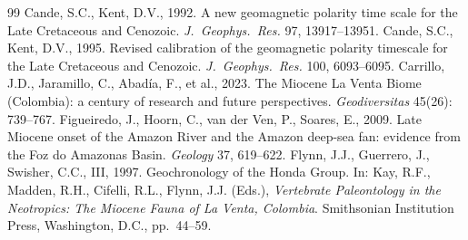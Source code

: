 \documentclass[11pt]{article}
\begin{document}
\begin{thebibliography}{99}
\small
{} Cande, S.C., Kent, D.V., 1992.
A new geomagnetic polarity time scale for the Late Cretaceous and Cenozoic.
\textit{J.\ Geophys.\ Res.} 97, 13917--13951.
 Cande, S.C., Kent, D.V., 1995.
Revised calibration of the geomagnetic polarity timescale for the Late
Cretaceous and Cenozoic. \textit{J.\ Geophys.\ Res.} 100, 6093--6095.
 Carrillo, J.D., Jaramillo, C.,
Abad\'ia, F., et al., 2023. The Miocene La Venta Biome (Colombia): a century of
research and future perspectives. \textit{Geodiversitas} 45(26): 739--767.
 Figueiredo, J., Hoorn, C.,
van der Ven, P., Soares, E., 2009. Late Miocene onset of the Amazon River and
the Amazon deep-sea fan: evidence from the Foz do Amazonas Basin.
\textit{Geology} 37, 619--622.
 Flynn, J.J., Guerrero, J., Swisher, C.C., III, 1997.
Geochronology of the Honda Group. In: Kay, R.F., Madden, R.H., Cifelli, R.L., Flynn, J.J.
(Eds.), \textit{Vertebrate Paleontology in the Neotropics: The Miocene Fauna of La Venta,
Colombia}. Smithsonian Institution Press, Washington, D.C., pp.\ 44--59.


\end{thebibliography}
\end{document}
